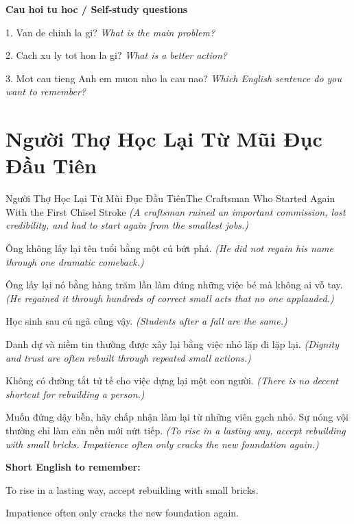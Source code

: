 \begin{tuhocnhanh}
\textbf{Cau hoi tu hoc / Self-study questions}

1. Van de chinh la gi? \textit{What is the main problem?}

2. Cach xu ly tot hon la gi? \textit{What is a better action?}

3. Mot cau tieng Anh em muon nho la cau nao? \textit{Which English sentence do you want to remember?}
\end{tuhocnhanh}
\ngancach

\section{Người Thợ Học Lại Từ Mũi Đục Đầu Tiên}
\begin{truyen}{Người Thợ Học Lại Từ Mũi Đục Đầu Tiên}{The Craftsman Who Started Again With the First Chisel Stroke}
\textit{(A craftsman ruined an important commission, lost credibility, and had to start again from the smallest jobs.)}

Ông không lấy lại tên tuổi bằng một cú bứt phá.
\textit{(He did not regain his name through one dramatic comeback.)}

Ông lấy lại nó bằng hàng trăm lần làm đúng những việc bé mà không ai vỗ tay.
\textit{(He regained it through hundreds of correct small acts that no one applauded.)}

Học sinh sau cú ngã cũng vậy.
\textit{(Students after a fall are the same.)}

Danh dự và niềm tin thường được xây lại bằng việc nhỏ lặp đi lặp lại.
\textit{(Dignity and trust are often rebuilt through repeated small actions.)}

Không có đường tắt tử tế cho việc dựng lại một con người.
\textit{(There is no decent shortcut for rebuilding a person.)}

\end{truyen}

\begin{baihoc}
Muốn đứng dậy bền, hãy chấp nhận làm lại từ những viên gạch nhỏ. Sự nóng vội thường chỉ làm căn nền mới nứt tiếp.
\textit{(To rise in a lasting way, accept rebuilding with small bricks. Impatience often only cracks the new foundation again.)}
\end{baihoc}

\begin{ghinhoanh}
\textbf{Short English to remember:}

To rise in a lasting way, accept rebuilding with small bricks.

Impatience often only cracks the new foundation again.

\end{ghinhoanh}

